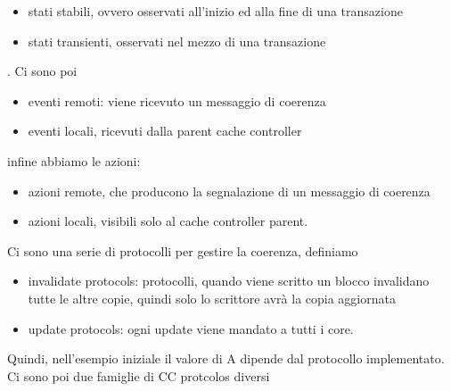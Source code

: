 \documentclass[12pt, oneside]{extbook} %
\begin{document}
\begin{itemize}
	\item stati stabili, ovvero osservati all'inizio ed alla fine di una transazione
	\item stati transienti, osservati nel mezzo di una transazione
\end{itemize}. Ci sono poi
\begin{itemize}
\item eventi remoti: viene ricevuto un messaggio di coerenza
\item eventi locali, ricevuti dalla parent cache controller
\end{itemize}
infine abbiamo le azioni:
\begin{itemize}
	\item azioni remote, che producono la segnalazione di un messaggio di coerenza
	\item azioni locali, visibili solo al cache controller parent.
\end{itemize}
Ci sono una serie di protocolli per gestire la coerenza, definiamo
\begin{itemize}
\item invalidate protocols: protocolli, quando viene scritto un blocco invalidano tutte le altre copie, quindi solo lo scrittore avrà la copia aggiornata
\item update protocols: ogni update viene mandato a tutti i core.
\end{itemize}
Quindi, nell'esempio iniziale il valore di A dipende dal protocollo implementato. Ci sono poi due famiglie di CC protcolos diversi
\end{document}
